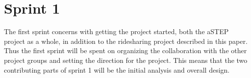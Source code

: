 \chapter{Sprint 1}
The first sprint concerns with getting the project started, both the aSTEP project as a whole, in addition to the ridesharing project described in this paper.
Thus the first sprint will be spent on organizing the collaboration with the other project groups and setting the direction for the project.
This means that the two contributing parts of sprint 1 will be the initial analysis and overall design.


%
%